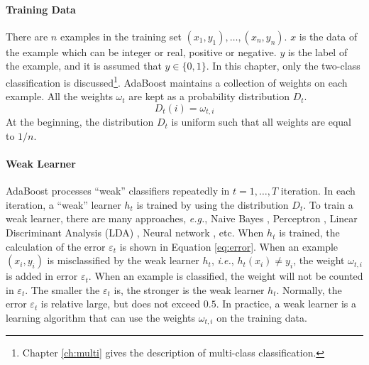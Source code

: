 \paragraph{Training Data}There are $n$ examples in the training set $(x_{1},y_{1}),\ldots,(x_{n},y_{n})$. $x$ is the data of the example which can be integer or real, positive or negative. $y$ is the label of the example, and it is assumed that $y \in \{0,1\}$. In this chapter, only the two-class classification is discussed\footnote{\mbox{Chapter} \ref{ch:multi} gives the description of multi-class classification.}. AdaBoost maintains a collection of weights on each example. All the weights $\omega_{t}$ are kept as a probability distribution $D_{t}$.
\begin{equation}\label{eq:distribution}\nonumber
 D_{t}(i) = \omega_{t,i}
\end{equation}
At the beginning, the distribution $D_{t}$ is uniform such that all weights are equal to $1/n$. 

\paragraph{Weak Learner}
AdaBoost processes ``weak'' classifiers repeatedly in $t=1,\ldots,T$ iteration. In each iteration, a ``weak'' learner $h_{t}$ is trained by using the distribution $D_{t}$. To train a weak learner, there are many approaches, \textit{e.g.}, Naive Bayes \cite{Domingos1997}, Perceptron \cite{Rosenblatt1958}, Linear Discriminant Analysis (LDA) \cite{Martinez2001}, Neural network \cite{Riedmiller1993}, etc. When $h_{t}$ is trained, the calculation of the error $\varepsilon_{t}$ is shown in \mbox{Equation} \ref{eq:error}. When an example $(x_{i},y_{i})$ is misclassified by the weak learner $h_{t}$, \textit{i.e.}, $h_{t}(x_{i})\neq y_{i}$, the weight  $\omega_{t,i}$ is added in error $\varepsilon_{t}$. When an example is classified, the weight will not be counted in $\varepsilon_{t}$.
The smaller the $\varepsilon_t$ is, the stronger is the weak learner $h_t$. Normally, the error $\varepsilon_{t}$ is relative large, but does not exceed $0.5$. In practice, a weak learner is a learning algorithm that can use the weights $\omega_{t,i}$ on the training data.

